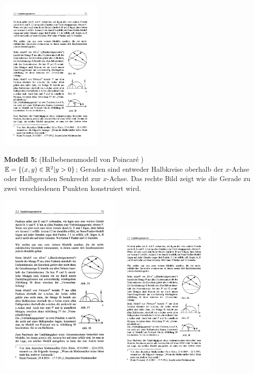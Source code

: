 \centerline{\includegraphics[width=5cm]{BILDER/BildBierdeckelgeometrie.pdf}}


\bigskip


{\bf Modell 5:} (\glqq Halbebenenmodell von Poincar\'e \grqq )\\
$\mathbb E=\{ (x,y)\in\mathbb R^2 | y>0 \}$;
Geraden sind entweder Halbkreise oberhalb der $x$-Achse
oder Halbgeraden Senkrecht zur $x$-Achse. Das rechte Bild zeigt wie 
die Gerade zu zwei verschiedenen Punkten konstruiert wird. 


\centerline{
\includegraphics[width=6cm]{BILDER/BildPoincareHalbebene1.pdf}
\hspace*{1cm}
\includegraphics[width=5cm]{BILDER/BildPoincareHalbebene2.pdf}
}


